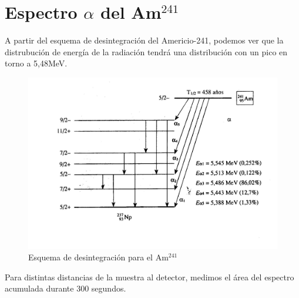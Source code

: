 \documentclass[a4paper,12pt,spanish]{article}
\begin{document}
	\section{Espectro $\alpha$ del Am$^{241}$}
	
	A partir del esquema de desintegración del Americio-241, podemos ver que la distrubución de energía de la radiación tendrá una distribución con un pico en torno a 5,48MeV. 
	
	
	
\begin{figure}[H]
	\centering
	\includegraphics[width=0.7\linewidth]{imagenes/americio}
	\caption{Esquema de desintegración para el Am$^{241}$}
	\label{fig:americio}
\end{figure}
	
	
	
	
	Para distintas distancias de la muestra al detector, medimos el área del espectro acumulada durante 300 segundos.
	
	 
	 
\end{document}

